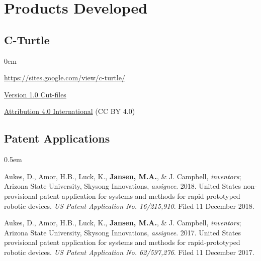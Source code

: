 \documentclass[12pt,a4paper]{article}
\begin{document}
\section*{Products Developed}
	\subsection*{C-Turtle}
		\begin{description}
			\itemsep0em
			\item[Website] \href{https://sites.google.com/view/c-turtle/}{https://sites.google.com/view/c-turtle/}
			\item[Design] \href{https://drive.google.com/file/d/0BxntR7XVPIVqekR3Sjcyd1hkUm8/view}{Version 1.0 Cut-files}
			\item[License] \href{https://creativecommons.org/licenses/by/4.0/}{Attribution 4.0 International} (CC BY 4.0)
		\end{description}

	\subsection*{Patent Applications}
		\begin{description}
			\itemsep0.5em
			\item Aukes, D., Amor, H.B., Luck, K., \textbf{Jansen, M.A.}, \& J. Campbell, \textit{inventors}; Arizona State University, Skysong Innovations, \textit{assignee}. 2018. United States non-provisional patent application for systems and methods for rapid-prototyped robotic devices. \textit{US Patent Application No. 16/215,910}. Filed 11 December 2018.
			
			\item Aukes, D., Amor, H.B., Luck, K., \textbf{Jansen, M.A.}, \& J. Campbell, \textit{inventors}; Arizona State University, Skysong Innovations, \textit{assignee}. 2017. United States provisional patent application for systems and methods for rapid-prototyped robotic devices. \textit{US Patent Application No. 62/597,276}. Filed 11 December 2017.
		\end{description}
\end{document}
